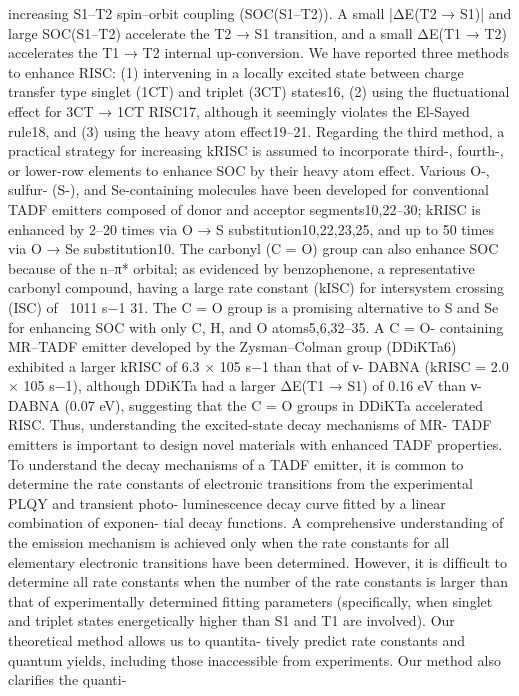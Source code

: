 increasing S1–T2 spin–orbit coupling (SOC(S1–T2)). A small |ΔE(T2 → S1)|
and large SOC(S1–T2) accelerate the T2 → S1 transition, and a small
ΔE(T1 → T2) accelerates the T1 → T2 internal up-conversion.
We have reported three methods to enhance RISC: (1) intervening
in a locally excited state between charge transfer type singlet (1CT)
and triplet (3CT) states16, (2) using the ﬂuctuational effect for 3CT → 1CT
RISC17, although it seemingly violates the El-Sayed rule18, and (3) using
the heavy atom effect19–21. Regarding the third method, a practical
strategy for increasing kRISC is assumed to incorporate third-, fourth-,
or lower-row elements to enhance SOC by their heavy atom effect.
Various O-, sulfur- (S-), and Se-containing molecules have been
developed for conventional TADF emitters composed of donor and
acceptor segments10,22–30; kRISC is enhanced by 2–20 times via O → S
substitution10,22,23,25, and up to 50 times via O → Se substitution10. The
carbonyl (C = O) group can also enhance SOC because of the n–π*
orbital; as evidenced by benzophenone, a representative carbonyl
compound, having a large rate constant (kISC) for intersystem crossing
(ISC) of ~1011 s−1 31. The C = O group is a promising alternative to S and
Se for enhancing SOC with only C, H, and O atoms5,6,32–35. A C = O-
containing MR–TADF emitter developed by the Zysman–Colman
group (DDiKTa6) exhibited a larger kRISC of 6.3 × 105 s−1 than that of ν-
DABNA (kRISC = 2.0 × 105 s−1), although DDiKTa had a larger ΔE(T1 → S1)
of 0.16 eV than ν-DABNA (0.07 eV), suggesting that the C = O groups in
DDiKTa accelerated RISC.
Thus, understanding the excited-state decay mechanisms of MR-
TADF emitters is important to design novel materials with enhanced
TADF properties. To understand the decay mechanisms of a TADF
emitter, it is common to determine the rate constants of electronic
transitions
from the
experimental PLQY
and
transient
photo-
luminescence decay curve ﬁtted by a linear combination of exponen-
tial decay functions. A comprehensive understanding of the emission
mechanism is achieved only when the rate constants for all elementary
electronic transitions have been determined. However, it is difﬁcult to
determine all rate constants when the number of the rate constants is
larger than that of experimentally determined ﬁtting parameters
(speciﬁcally, when singlet and triplet states energetically higher than S1
and T1 are involved). Our theoretical method allows us to quantita-
tively predict rate constants and quantum yields, including those
inaccessible from experiments. Our method also clariﬁes the quanti-
